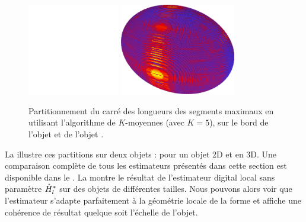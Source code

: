 \begin{figure}[ht]{
  \begin{center}
    \includegraphics[height=4cm]{images/Curvature/Flower_kMeans-5}
    \includegraphics[height=4cm]{images/Curvature/Ellipsoid_Radius_2}
  \end{center}}
  \caption{Partitionnement du carré des longueurs des segments
  maximaux en utilisant l'algorithme de $K$-moyennes (avec $K=5$), sur le bord
  de l'objet \Flower et de l'objet \Ellipsoid
  \label{fig:curvature-pfl-map}.}
\end{figure}

La  illustre ces partitions sur
deux objets : \Flower pour un objet 2D et \Ellipsoid en 3D.
%
Une comparaison complète de tous les estimateurs présentés dans cette section
est disponible dans le . La
 montre le résultat de l'estimateur
digital local sans paramètre $\hat{H}^{*}_{l}$ sur des objets de différentes
tailles. Nous pouvons alors voir que l'estimateur s'adapte parfaitement à la
géométrie locale de la forme et affiche une cohérence de résultat quelque soit
l'échelle de l'objet.

